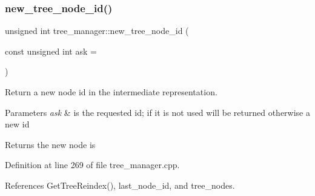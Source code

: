 \subsubsection{\texorpdfstring{new\+\_\+tree\+\_\+node\+\_\+id()}{new\_tree\_node\_id()}}
{\footnotesize\ttfamily unsigned int tree\+\_\+manager\+::new\+\_\+tree\+\_\+node\+\_\+id (\begin{DoxyParamCaption}\item[{const unsigned int}]{ask = {} }\end{DoxyParamCaption})}



Return a new node id in the intermediate representation. 


\begin{DoxyParams}{Parameters}
{\em ask} & is the requested id; if it is not used will be returned otherwise a new id \\
\hline
\end{DoxyParams}
\begin{DoxyReturn}{Returns}
the new node is 
\end{DoxyReturn}


Definition at line 269 of file tree\+\_\+manager.\+cpp.



References Get\+Tree\+Reindex(), last\+\_\+node\+\_\+id, and tree\+\_\+nodes.



